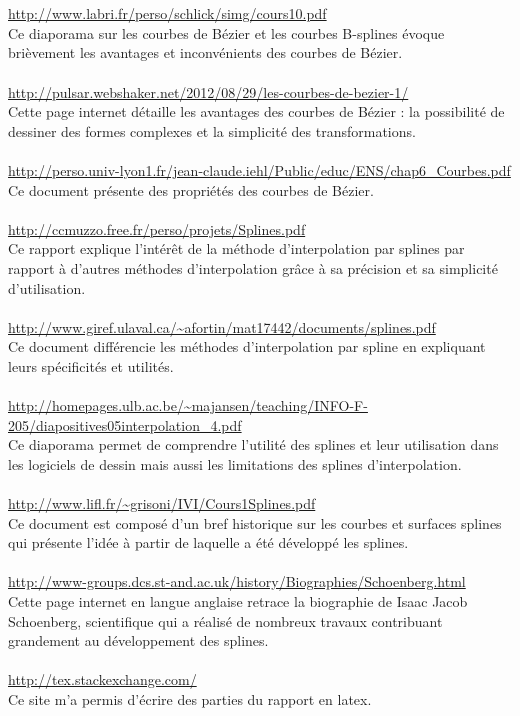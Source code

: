 \documentclass{article}
\begin{document}
\\\\
{\color{blue}
\url{http://www.labri.fr/perso/schlick/simg/cours10.pdf}} 
\\
Ce diaporama sur les courbes de B\'{e}zier et les courbes B-splines \'{e}voque bri\`{e}vement les avantages et inconv\'{e}nients des courbes de B\'{e}zier.
\\\\
{\color{blue}
\url{http://pulsar.webshaker.net/2012/08/29/les-courbes-de-bezier-1/ }} 
\\
Cette page internet d\'{e}taille les avantages des courbes de B\'{e}zier : la possibilit\'{e} de dessiner des formes complexes et la simplicit\'{e} des transformations.
\\\\
{\color{blue}
\url{http://perso.univ-lyon1.fr/jean-claude.iehl/Public/educ/ENS/chap6_Courbes.pdf }} 
\\
Ce document pr\'{e}sente des propri\'{e}t\'{e}s des courbes de B\'{e}zier.
\\\\
{\color{blue}
\url{http://ccmuzzo.free.fr/perso/projets/Splines.pdf }} 
\\
Ce rapport explique l'int\'{e}r\^{e}t de la m\'{e}thode d'interpolation par splines par rapport \`{a} d'autres m\'{e}thodes d'interpolation gr\^{a}ce \`{a} sa pr\'{e}cision et sa simplicit\'{e} d'utilisation.
\\\\
{\color{blue}
\url{http://www.giref.ulaval.ca/~afortin/mat17442/documents/splines.pdf}} 
\\
Ce document diff\'{e}rencie les m\'{e}thodes d'interpolation par spline en expliquant leurs sp\'{e}cificit\'{e}s et utilit\'{e}s.
\\\\
{\color{blue}
\url{http://homepages.ulb.ac.be/~majansen/teaching/INFO-F-205/diapositives05interpolation_4.pdf }} 
\\
Ce diaporama permet de comprendre l'utilit\'{e} des splines et leur utilisation dans les logiciels de dessin mais aussi les limitations des splines d'interpolation.
\\\\
{\color{blue}
\url{http://www.lifl.fr/~grisoni/IVI/Cours1Splines.pdf}} 
\\
Ce document est compos\'{e} d'un bref historique sur les courbes et surfaces splines qui pr\'{e}sente l'id\'{e}e \`{a} partir de laquelle a \'{e}t\'{e} d\'{e}velopp\'{e} les splines.
\\\\
{\color{blue}
\url{http://www-groups.dcs.st-and.ac.uk/history/Biographies/Schoenberg.html}} 
\\
Cette page internet en langue anglaise retrace la biographie de Isaac Jacob Schoenberg, scientifique qui a r\'{e}alis\'{e} de nombreux travaux  contribuant grandement au d\'{e}veloppement des splines.
\\\\
{\color{blue}
\url{http://tex.stackexchange.com/}} 
\\
Ce site m'a permis d'\'{e}crire des parties du rapport en latex.
\end{document}
